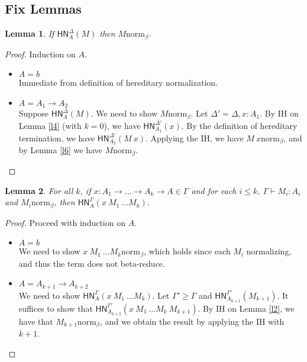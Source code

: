 \documentclass{article}
\newtheorem*{lemm}{Lemma}
\newcommand{\hasEF}[3]{\ensuremath{#1 \vdash #2 : #3}}
\newcommand{\bnorm}[1]{\ensuremath{#1 \mathrel{\text{norm}_\beta}}}
\newcommand{\hnorm}[3]{\ensuremath{\mathsf{HN}^{#1}_{#2}(#3)}}
\newcommand{\fn}[2]{\ensuremath{#1 \to #2}}
\newcommand{\ap}[2]{\ensuremath{#1\ #2}}
\begin{document}
\subsection{Fix Lemmas}

\begin{lemm}
If $\hnorm{\Delta}{A}{M}$ then $\bnorm{M}$.
\end{lemm}

\begin{proof}
Induction on $A$.
\begin{itemize}
  \setlength\itemsep{1em}
  \item $A = b$\\
  Immediate from definition of hereditary normalization.
  \item $A = \fn{A_1}{A_2}$\\
  Suppose $\hnorm{\Delta}{A}{M}$. We need to show $\bnorm{M}$. Let $\Delta' = \Delta, x : A_1$. By IH on Lemma \ref{l4} 
  (with $k = 0$), we have $\hnorm{\Delta'}{A_1}{x}$. By the definition of hereditary termination, we have 
  $\hnorm{\Delta'}{A_2}{\ap{M}{x}}$. Applying the IH, we have $\bnorm{\ap{M}{x}}$, and by Lemma \ref{l6} we have 
  $\bnorm{M}$. 
  \qedhere
\end{itemize}
\end{proof}

\begin{lemm}
For all $k$, if $x : A_1 \to \dots \to A_k \to A \in \Gamma$ and for each $i \le k$, $\hasEF{\Gamma}{M_i}{A_i}$ and $\bnorm{M_i}$, then $\hnorm{\Gamma}{A}{\ap{\ap{x}{M_1}}{\dots M_k}}$.
\end{lemm}

\begin{proof}
Proceed with induction on $A$.
\begin{itemize}
  \setlength\itemsep{1em}
  \item $A = b$\\
  We need to show $\bnorm{\ap{\ap{x}{M_1}}{\dots M_k}}$, which holds since each $M_i$ normalizing, and thus the 
  term does not beta-reduce.
  \item $A = \fn{A_{k+1}}{A_{k+2}}$\\
  We need to show $\hnorm{\Gamma}{A}{\ap{\ap{x}{M_1}}{\dots M_k}}$. Let $\Gamma' \ge \Gamma$ and 
  $\hnorm{\Gamma'}{A_{k+1}}{M_{k+1}}$. It suffices to show that 
  $\hnorm{\Gamma'}{A_{k+2}}{\ap{\ap{\ap{x}{M_1}}{\dots M_k}}{M_{k+1}}}$.
  By IH on Lemma \ref{l2}, we have that $\bnorm{M_{k+1}}$, and we obtain the result by applying the IH with $k + 1$.
\end{itemize}
\end{proof}
\end{document}
